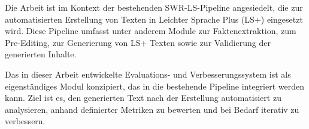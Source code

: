 Die Arbeit ist im Kontext der bestehenden SWR-LS-Pipeline angesiedelt, die zur automatisierten Erstellung von Texten in Leichter Sprache Plus (LS+) eingesetzt wird. Diese Pipeline umfasst unter anderem Module zur Faktenextraktion, zum Pre-Editing, zur Generierung von LS+ Texten sowie zur Validierung der generierten Inhalte.

Das in dieser Arbeit entwickelte Evaluations- und Verbesserungssystem ist als eigenständiges Modul konzipiert, das in die bestehende Pipeline integriert werden kann. Ziel ist es, den generierten Text nach der Erstellung automatisiert zu analysieren, anhand definierter Metriken zu bewerten und bei Bedarf iterativ zu verbessern.